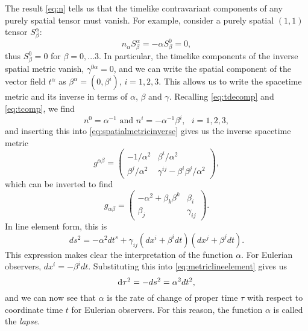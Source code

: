 The result \ref{eq:n} tells us that the timelike contravariant components of any purely spatial tensor must vanish. For example, consider a purely spatial $(1,1)$ tensor $S^\alpha_\beta$:
\begin{equation}
n_\alpha S^\alpha_\beta = -\alpha S^0_\beta =0,
\end{equation}
thus $S^0_\beta=0$ for $\beta=0,...3$. In particular, the timelike components of the inverse spatial metric vanish, $\gamma^{0 \alpha}=0$, and we can write the spatial component of the vector field $t^\alpha$ as $\beta^\alpha=(0,\beta^i)$, $i=1,2,3$. This allows us to write the spacetime metric and its inverse in terms of $\alpha$, $\beta$ and $\gamma$. Recalling \ref{eq:tdecomp} and \ref{eq:tcomp}, we find
\begin{equation}
n^0 = \alpha^{-1} \mbox{ and } n^i= -\alpha^{-1} \beta^i, \mbox{ }i=1,2,3,
\end{equation}
and inserting this into \ref{eq:spatialmetricinverse} gives us the inverse spacetime metric
\begin{equation}
\label{eq:invmetric}
g^{\alpha \beta} = \left( \begin{array}{ccc}
						-1/\alpha^2 		& 	\beta^i / \alpha^2 \\
						\beta^j / \alpha^2 	&	\gamma^{ij}-\beta^i\beta^j / \alpha^2 
						\end{array} \right),
\end{equation}
which can be inverted to find
\begin{equation}
\label{eq:metric}
g_{\alpha \beta} = \left( \begin{array}{ccc}
						-\alpha^2 + \beta_k \beta^k & \beta_i \\
							\beta_j					& \gamma_{ij}
						\end{array} \right).
\end{equation}
In line element form, this is 
\begin{equation}
\label{eq:metriclineelement}
ds^2=-\alpha^2 dt^s + \gamma_{ij}(dx^i + \beta^i dt)(dx^j + \beta^j dt).
\end{equation}
This expression makes clear the interpretation of the function $\alpha$. For Eulerian observers, $dx^i=-\beta^i dt$. Substituting this into \ref{eq:metriclineelement} gives us 
\begin{equation}
{\mbox{d}}\tau^2 = -ds^2 =\alpha^2 dt^2,
\end{equation}
and we can now see that $\alpha$ is the rate of change of proper time $\tau$ with respect to coordinate time $t$ for Eulerian observers. For this reason, the function $\alpha$ is called the \textit{lapse}.

